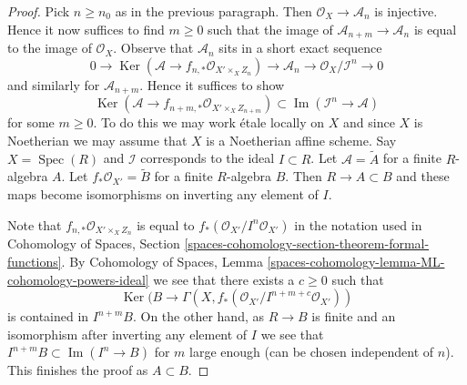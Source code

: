 \documentclass[10pt,a4paper]{amsart}
\theoremstyle{plain}
\theoremstyle{definition}
\theoremstyle{remark}
\numberwithin{equation}{subsection}
\def\Spec{\mathop{\mathrm{Spec}}}
\def\Ker{\mathop{\mathrm{Ker}}}
\def\Im{\mathop{\mathrm{Im}}}
\begin{document}
\begin{proof}
\medskip\noindent
Pick $n \geq n_0$ as in the previous paragraph. Then
$\mathcal{O}_X \to \mathcal{A}_n$ is injective. Hence it now
suffices to find $m \geq 0$ such that the image of
$\mathcal{A}_{n + m} \to \mathcal{A}_n$ is equal
to the image of $\mathcal{O}_X$. Observe that $\mathcal{A}_n$
sits in a short exact sequence
$$
0 \to \Ker(\mathcal{A} \to f_{n, *}\mathcal{O}_{X' \times_X Z_n})
\to \mathcal{A}_n \to \mathcal{O}_X/\mathcal{I}^n \to 0
$$
and similarly for $\mathcal{A}_{n + m}$. Hence it suffices to show
$$
\Ker(\mathcal{A} \to f_{n + m, *}\mathcal{O}_{X' \times_X Z_{n + m}})
\subset
\Im(\mathcal{I}^n \to \mathcal{A})
$$
for some $m \geq 0$. To do this we may work \'etale locally on
$X$ and since $X$ is Noetherian we may assume that $X$ is
a Noetherian affine scheme. Say $X = \Spec(R)$ and $\mathcal{I}$
corresponds to the ideal $I \subset R$. Let $\mathcal{A} = \widetilde{A}$
for a finite $R$-algebra $A$. Let $f_*\mathcal{O}_{X'} = \widetilde{B}$
for a finite $R$-algebra $B$. Then $R \to A \subset B$ and these maps
become isomorphisms on inverting any element of $I$.

\medskip\noindent
Note that $f_{n, *}\mathcal{O}_{X' \times_X Z_n}$
is equal to $f_*(\mathcal{O}_{X'}/I^n\mathcal{O}_{X'})$
in the notation used in Cohomology of Spaces, Section
\ref{spaces-cohomology-section-theorem-formal-functions}.
By Cohomology of Spaces, Lemma
\ref{spaces-cohomology-lemma-ML-cohomology-powers-ideal}
we see that there exists a $c \geq 0$ such that
$$
\Ker(B \to \Gamma(X, f_*(\mathcal{O}_{X'}/I^{n + m + c}\mathcal{O}_{X'}))
$$
is contained in $I^{n + m}B$. On the other hand, as $R \to B$ is
finite and an isomorphism after inverting any element of $I$
we see that $I^{n + m}B \subset \Im(I^n \to B)$ for $m$ large enough
(can be chosen independent of $n$). This finishes the proof as $A \subset B$.
\end{proof}
\end{document}
